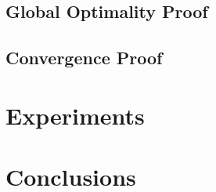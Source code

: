 \documentclass{article}
\begin{document}
\subsection{Global Optimality Proof}
\subsection{Convergence Proof}

\section{Experiments}

\section{Conclusions}

%

\end{document}
